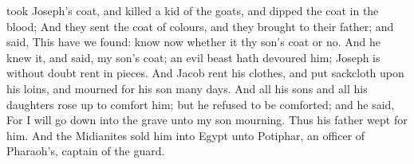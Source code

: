 {took
Joseph’s
coat, and
killed a
kid of the
goats, and
dipped the
coat in the
blood;
And they
sent the
coat of
{}
colours, and they
brought
{} to their
father; and
said, This have we
found:
know now whether it
{} thy
son’s
coat or no.
And he knew
it, and
said,
{} my
son’s
coat; an
evil
beast hath
devoured him;
Joseph is without
doubt rent in
pieces.
And
Jacob
rent his
clothes, and
put
sackcloth upon his
loins, and
mourned for his
son
many
days.
And all his
sons and all his
daughters rose
up to
comfort him; but he
refused to be
comforted; and he
said, For I will go
down into the
grave unto my
son
mourning. Thus his
father
wept for him.
And the
Midianites
sold him into
Egypt unto
Potiphar, an
officer of
Pharaoh’s,
{}
captain of the
guard.

}
